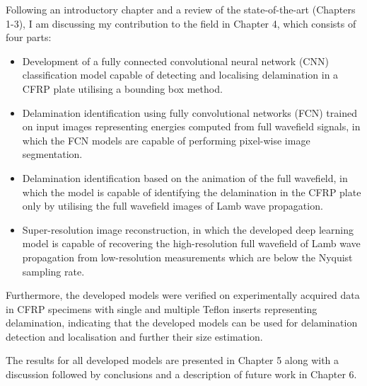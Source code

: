 \documentclass{article}
\begin{document}
	Following an introductory chapter and a review of the state-of-the-art (Chapt\-ers 1-3), I am discussing my contribution to the field in Chapter 4, which consists of four parts:
	\begin{itemize}
		\item Development of a fully connected convolutional neural network (CNN) classifica\-tion model capable of detecting and localising delamination in a CFRP plate utilising a bounding box method.
		\item Delamination identification using fully convolutional networks (FCN) train\-ed on input images representing energies computed from full wavefield signals, in which the FCN models are capable of performing pixel-wise image segmentation.
		\item Delamination identification based on the animation of the full wavefield, in which the model is capable of identifying the delamination in the CFRP plate only by utilising the full wavefield images of Lamb wave propagation.
		\item Super-resolution image reconstruction, in which the developed deep learn\-ing model is capable of recovering the high-resolution full wavefield of Lamb wave propagation from low-resolution measurements which are below the Nyquist samp\-ling rate.
	\end{itemize}
	Furthermore, the developed models were verified on experimentally acquired data in CFRP specimens with single and multiple Teflon inserts representing delamination, indicating that the developed models can be used for
	delamination detection and localisation and further their size estimation.
	
	The results for all developed models are presented in Chapter 5 along with a discussion followed by conclusions and a description of future work in Chapter 6.
\end{document}
